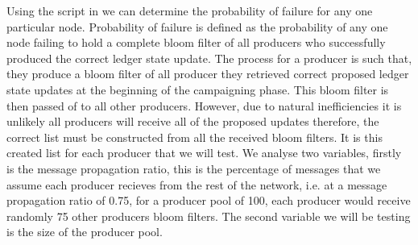 \documentclass{article}
\begin{document}
Using the script in \cite{python} we can determine the probability of failure for any one particular node. Probability of failure is defined as the probability of any one node failing to hold a complete bloom filter of all producers who successfully produced the correct ledger state update. The process for a producer is such that, they produce a bloom filter of all producer they retrieved correct proposed ledger state updates at the beginning of the campaigning phase. This bloom filter is then passed of to  all other producers. However, due to natural inefficiencies it is unlikely all producers will receive all of the proposed updates therefore, the correct list must be constructed from all the received bloom filters. It is this created list for each producer that we will test. We analyse two variables, firstly is the message propagation ratio, this is the percentage of messages that we assume each producer recieves from the rest of the network, i.e. at a message propagation ratio of 0.75, for a producer pool of 100, each producer would receive randomly 75 other producers bloom filters. The second variable we will be testing is the size of the producer pool. 
\end{document}
